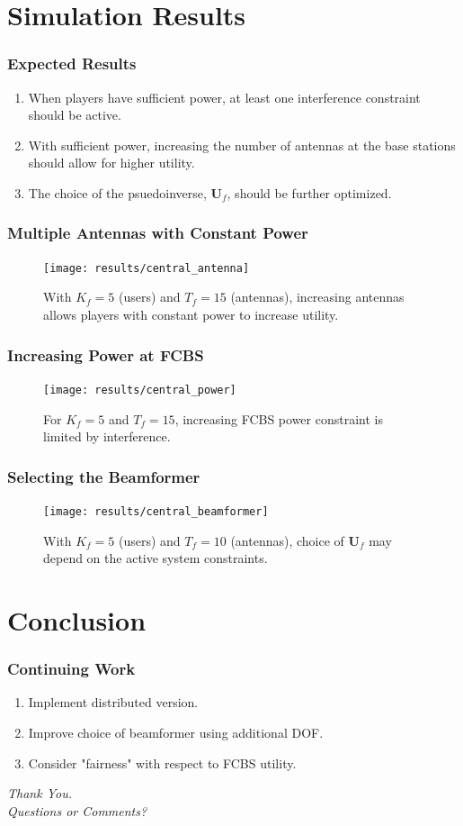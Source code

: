 \documentclass[10pt,tgadventor, onlymath]{beamer}
\begin{document}
\section{Simulation Results}

\begin{frame}
\frametitle{Expected Results}
\begin{enumerate}
\setlength\itemsep{2em}

\item
	When players have sufficient power, at least one interference constraint should be active.
\item
	With sufficient power, increasing the number of antennas at the base stations should allow for higher utility.
\item
	The choice of the psuedoinverse, $\mathbf{U}_{f}$, should be further optimized. 
\end{enumerate}
\end{frame}


\begin{frame}
\frametitle{Multiple Antennas with Constant Power}
\begin{figure}
	\texttt{[image: results/central\_antenna]}
	\caption{With $K_f = 5$ (users) and $T_f = 15$ (antennas), increasing antennas allows players with constant power to increase utility.}
\end{figure}
\end{frame}

\begin{frame}
\frametitle{Increasing Power at FCBS}
\begin{figure}
	\texttt{[image: results/central\_power]}
	\caption{For $K_f = 5$ and $T_f = 15$, increasing FCBS power constraint is limited by interference.}
\end{figure}
\end{frame}

\begin{frame}
\frametitle{Selecting the Beamformer}
\begin{figure}
	\texttt{[image: results/central\_beamformer]}
\caption{With $K_f = 5$ (users) and $T_f = 10$ (antennas), choice of $\mathbf{U}_{f}$ may depend on the active system constraints.}
\end{figure}
\end{frame}

\section{Conclusion}
\begin{frame}
\frametitle{Continuing Work}
\begin{enumerate}
\item
	Implement distributed version.
\item
	Improve choice of beamformer using additional DOF. 
\item
	Consider "fairness" with respect to FCBS utility.
\end{enumerate}
\end{frame}

\begin{frame}
  \centering \Large
  \emph{Thank You.}
  \\
	\bigskip
    \centering \Large
  \emph{Questions or Comments?}
\end{frame}
\end{document}
